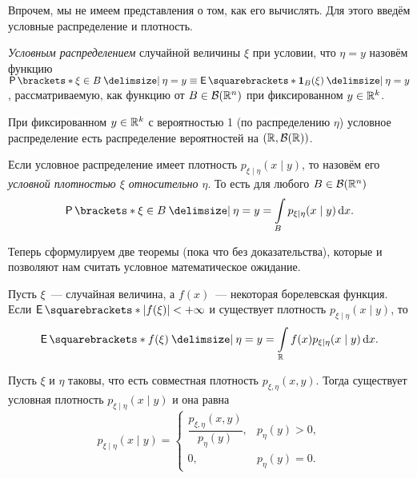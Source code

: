 Впрочем, мы не имеем представления о том, как его вычислять. Для этого введём условные распределение и плотность.
\begin{definition}
	\emph{Условным распределением} случайной величины \(\xi\) при условии, что \(\eta = y\) назовём функцию \(\Pr{\xi \in B \given \eta = y} \equiv \E{\mathbf{1}_{B}(\xi) \given \eta = y}\), рассматриваемую, как функцию от \(B \in \mathcal{B}(\mathbb{R}^n)\) при фиксированном \(y \in \mathbb{R}^k\).
\end{definition}

\begin{point}
	При фиксированном \(y \in \mathbb{R}^k\) с вероятностью 1 (по распределению \(\eta\)) условное распределение есть распределение вероятностей на \((\mathbb{R}, \mathcal{B}(\mathbb{R}))\).
\end{point}

\begin{definition}
	Если условное распределение имеет плотность \(p_{\xi \mid \eta}(x \mid y)\), то назовём его \emph{условной плотностью \(\xi\) относительно \(\eta\)}. То есть для любого \(B \in \mathcal{B}(\mathbb{R}^n)\)
	\[
		\Pr{\xi \in B \given \eta = y} = \int\limits_{B} p_{\xi \mid \eta}(x \mid y)\diff x.
	\]
\end{definition}

Теперь сформулируем две теоремы (пока что без доказательства), которые и позволяют нам считать условное математическое ожидание.
\begin{theorem}
	Пусть \(\xi\)~--- случайная величина, а \(f(x)\)~--- некоторая борелевская функция. Если \(\E{|f(\xi)|} < +\infty\) и существует плотность \(p_{\xi \mid \eta}(x \mid y)\), то
	\[
		\E{f(\xi) \given \eta = y} = \int\limits_{\R} f(x)p_{\xi \mid \eta}(x \mid y)\diff x.
	\]
\end{theorem}
\begin{theorem}
	Пусть \(\xi\) и \(\eta\) таковы, что есть совместная плотность \(p_{\xi, \eta}(x, y)\). Тогда существует условная плотность \(p_{\xi \mid \eta}(x \mid y)\) и она равна
	\[
		p_{\xi \mid \eta}(x \mid y) = \begin{cases}
		\dfrac{p_{\xi, \eta}(x, y)}{p_{\eta}(y)},& p_{\eta}(y) > 0, \\
		0,& p_{\eta}(y) = 0.
		\end{cases}
	\]
\end{theorem}

